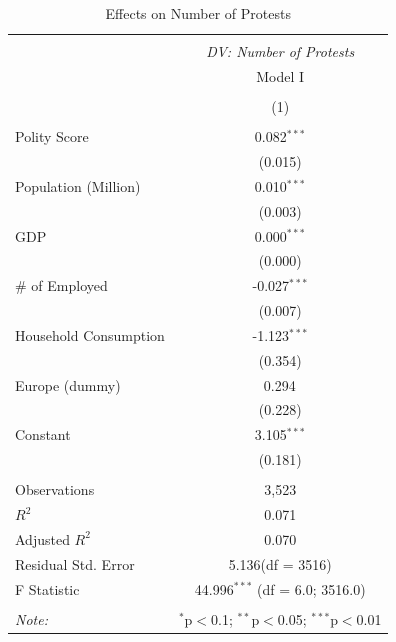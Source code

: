 \documentclass[12pt]{article}
\begin{document}
\begin{table}[H] \centering
\caption{Effects on Number of Protests}
\begin{tabular}{@{\extracolsep{5pt}}lc}
\\[-1.8ex]\hline
\hline \\[-1.8ex]
& \multicolumn{1}{c}{\textit{DV: Number of Protests}} \
\cr \cline{1-2}
\\[-1.8ex] & \multicolumn{1}{c}{Model I} \\\\[-1.8ex] & (1) \\
\hline \\[-1.8ex]
 Polity Score & 0.082$^{***}$ \\
  & (0.015) \\
 Population (Million) & 0.010$^{***}$ \\
  & (0.003) \\
 GDP & 0.000$^{***}$ \\
  & (0.000) \\
 \# of Employed & -0.027$^{***}$ \\
  & (0.007) \\
 Household Consumption & -1.123$^{***}$ \\
  & (0.354) \\
 Europe (dummy) & 0.294$^{}$ \\
  & (0.228) \\
 Constant & 3.105$^{***}$ \\
  & (0.181) \\
\hline \\[-1.8ex]
 Observations & 3,523 \\
 $R^2$ & 0.071 \\
 Adjusted $R^2$ & 0.070 \\
 Residual Std. Error & 5.136(df = 3516)  \\
 F Statistic & 44.996$^{***}$ (df = 6.0; 3516.0) \\
\hline
\hline \\[-1.8ex]
\textit{Note:} & \multicolumn{1}{r}{$^{*}$p$<$0.1; $^{**}$p$<$0.05; $^{***}$p$<$0.01} \\
\end{tabular}
\end{table}
\end{document}
